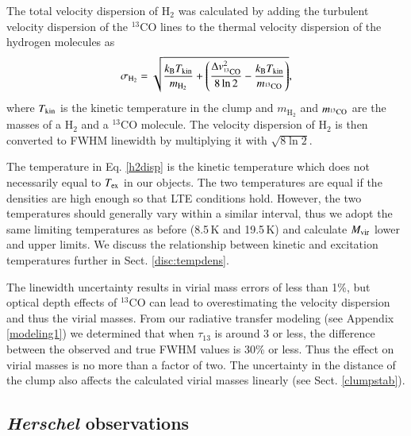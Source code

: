 \documentclass[printer]{aa}
\begin{document}
The total velocity dispersion of H$_2$ was calculated by adding the turbulent velocity dispersion of the $^{13}$CO lines to the thermal velocity dispersion of the hydrogen molecules as
\begin{equation}
\sigma_{\rm H_2}=\sqrt{\frac{k_\mathrm{B} T_{\rm kin}}{m_\mathrm{H_2}}+\left(\frac{\Delta v_\mathrm{{^{13}CO}}^2}{8\ln2}-\frac{k_\mathrm{B} T_{\rm kin}}{m_\mathrm{^{13}CO}}\right)},
\label{h2disp}
\end{equation}
where $T_{\rm kin}$ is the kinetic temperature in the clump and $m_{\mathrm{H_2}}$ and $m_{\rm ^{13}CO}$ are the masses of a H$_2$ and a $^{13}$CO molecule. The velocity dispersion of H$_2$ is then converted to FWHM linewidth by multiplying it with $\sqrt{8\ln2}$.

The temperature in Eq. \ref{h2disp} is the kinetic temperature which does not necessarily equal to $T_{\rm ex}$ in our objects. The two temperatures are equal if the densities are high enough so that LTE conditions hold. However, the two temperatures should generally vary within a similar interval, thus we adopt the same limiting temperatures as before (8.5\,K and 19.5\,K) and calculate $M_{\rm vir}$ lower and upper limits. We discuss the relationship between kinetic and excitation temperatures further in Sect. \ref{disc:tempdens}.

The linewidth uncertainty results in virial mass errors of less than 1\%, but optical depth effects of $^{13}$CO can lead to overestimating the velocity dispersion and thus the virial masses. From our radiative transfer modeling (see Appendix \ref{modeling1}) we determined that when $\tau_{13}$ is around 3 or less, the difference between the observed and true FWHM values is 30\% or less. Thus the effect on virial masses is no more than a factor of two. The uncertainty in the distance of the clump also affects the calculated virial masses linearly (see Sect. \ref{clumpstab}).

\subsection{\textit{Herschel} observations}
\label{herscheldata}
\end{document}
